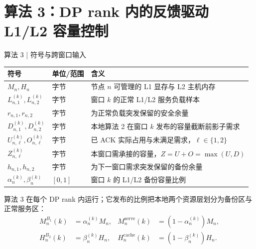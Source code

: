 \section{算法 3：DP rank 内的反馈驱动 L1/L2 容量控制}

\begin{frame}{算法 3 | 符号与跨窗口输入}
  \scriptsize
  \renewcommand{\arraystretch}{1.08}
  \begin{tabularx}{\textwidth}{p{}p{}X}
    \toprule
    符号 & 单位/范围 & 含义 \\
    \midrule
    $M_n,H_n$ & 字节 & 节点 $n$ 可管理的 L1 显存与 L2 主机内存 \\
    $L_{n,1}^{(k)},L_{n,2}^{(k)}$ & 字节 & 窗口 $k$ 的正常 L1/L2 服务负载样本 \\
    $r_{n,1},r_{n,2}$ & 字节 & 为正常负载突发保留的安全余量 \\
    $D_{n,1}^{(k)},D_{n,2}^{(k)}$ & 字节 & 本地算法 2 在窗口 $k$ 发布的容量截断前影子需求 \\
    $U_{n,\ell}^{(k)},O_{n,\ell}^{(k)}$ & 字节 & 已 ACK 实际占用与未满足需求，$\ell\in\{1,2\}$ \\
    $Z_{n,\ell}^{(k)}$ & 字节 & 本窗口需承接的容量，$Z=U+O=\max(U,D)$ \\
    $h_{n,1},h_{n,2}$ & 字节 & 为下一窗口需求突发保留的备份余量 \\
    $\alpha_n^{(k)},\beta_n^{(k)}$ & $[0,1]$ & 窗口 $k$ 的 L1/L2 备份容量比例 \\
    \bottomrule
  \end{tabularx}

  \vspace{0.08cm}
  \small
  算法 3 在每个 DP rank 内运行；它发布的比例把本地两个资源层划分为备份区与正常服务区：
  \begin{equation}
    \begin{aligned}
      M_n^{B_1}(k)&=\alpha_n^{(k)}M_n,
      &M_n^{\mathrm{serve}}(k)&=(1-\alpha_n^{(k)})M_n,\\
      H_n^{B_2}(k)&=\beta_n^{(k)}H_n,
      &H_n^{\mathrm{cache}}(k)&=(1-\beta_n^{(k)})H_n.
    \end{aligned}
    \label{eq:tier-partition}
  \end{equation}

  \scriptsize
\end{frame}

